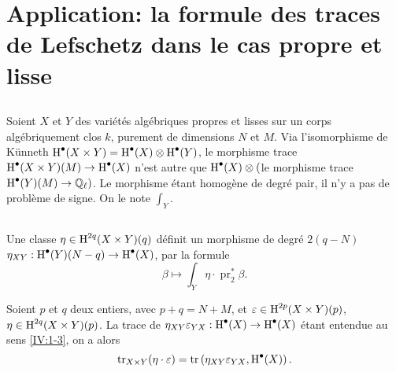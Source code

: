\section{Application: la formule des traces de Lefschetz dans le cas propre et lisse}\label{IV:3}





\subsection{}\label{IV:3-1}

Soient $X$ et $Y$ des variétés algébriques propres et lisses sur un corps 
algébriquement clos $k$, purement de dimensions $N$ et $M$. Via 
l'isomorphisme de K\"unneth 
$\operatorname{H}^\bullet(X\times Y)=\operatorname{H}^\bullet(X)\otimes \operatorname{H}^\bullet(Y)$, le morphisme trace 
$\operatorname{H}^\bullet(X\times Y)(M)\to \operatorname{H}^\bullet(X)$ n'est autre que 
$\operatorname{H}^\bullet(X)\otimes ($le morphisme trace $\operatorname{H}^\bullet(Y)(M)\to \mathbb{Q}_\ell)$. Le 
morphisme étant homogène de degré pair, il n'y a pas de problème de 
signe. On le note $\int_Y$. 





\subsection{}\label{IV:3-2}

Une classe $\eta\in \operatorname{H}^{2 q}(X\times Y)(q)$ définit un morphisme de degré 
$2(q-N)$ $\eta_{XY}:\operatorname{H}^\bullet(Y)(N-q)\to \operatorname{H}^\bullet(X)$, par la formule 
\[
  \beta \mapsto \int_Y \eta\cdot \operatorname{pr}_2^\ast \beta \text{.}
\]





\begin{proposition_}\label{IV:3-3}
Soient $p$ et $q$ deux entiers, avec $p+q=N+M$, et 
$\varepsilon\in \operatorname{H}^{2 p}(X\times Y)(p)$, $\eta\in \operatorname{H}^{2 q}(X\times Y)(p)$. La 
trace de $\eta_{X Y}\varepsilon_{Y X}:\operatorname{H}^\bullet(X)\to \operatorname{H}^\bullet(X)$ étant 
entendue au sens \ref{IV:1-3}, on a alors 
\[
  \operatorname{tr}_{X\times Y}(\eta\cdot \varepsilon) = \operatorname{tr}\left(\eta_{X Y}\varepsilon_{Y X},\operatorname{H}^\bullet(X)\right) \text{.}
\]
\end{proposition_}

